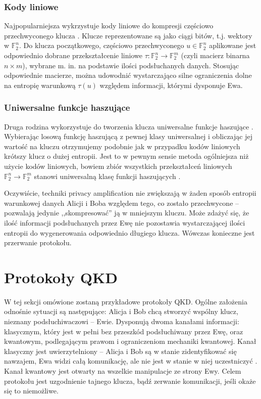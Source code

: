 \documentclass[10pt]{article}
\begin{document}
\subsubsection*{Kody liniowe}
Najpopularniejsza wykrzystuje kody liniowe do kompresji częściowo przechwyconego klucza \cite{Mayers01}.
Klucze reprezentowane są jako ciągi bitów, t.j. wektory w \(\mathbb{F}_2^n\). Do klucza początkowego,
częściowo przechwyconego \(u\in\mathbb{F}_2^n\) aplikowane jest odpowiednio dobrane przekształcenie 
liniowe \(\tau\colon\mathbb{F}_2^n\rightarrow \mathbb{F}_2^m\) (czyli macierz binarna \(n\times m\)), 
wybrane m. in. na podstawie ilości podsłuchanych danych. Stosując odpowiednie macierze, można udowodnić
wystarczająco silne ograniczenia dolne na entropię warunkową \(\tau(u)\) względem informacji,
którymi dysponuje Ewa.

\subsubsection*{Uniwersalne funkcje haszujące}

Druga rodzina wykorzystuje do tworzenia klucza uniwersalne funkcje haszujące \cite{Bennett95,Watanabe07}.
Wybierając losową funkcję haszującą z pewnej klasy uniwersalnej i obliczając jej wartość na kluczu
otrzymujemy podobnie jak w przypadku kodów liniowych krótszy klucz o dużej entropii. Jest to w pewnym
sensie metoda ogólniejsza niż użycie kodów liniowych, bowiem zbiór wszystkich przekształceń liniowych
\(\mathbb{F}_2^n\rightarrow \mathbb{F}_2^m\) stanowi uniwersalną klasę funkcji haszujących 
\cite{Carter79}.

\vspace{3mm}

Oczywiście, techniki privacy amplification nie zwiększają w żaden sposób entropii warunkowej danych
Alicji i Boba względem tego, co zostało przechwycone -- pozwalają jedynie ,,skompresować'' ją w
mniejszym kluczu. Może zdażyć się, że ilość informacji podsłuchanych przez Ewę nie pozostawia 
wystarczającej ilości entropii do wygenerowania odpowiednio długiego klucza. Wówczas konieczne jest
przerwanie protokołu. 


\section{Protokoły QKD}

W tej sekcji omówione zostaną przykładowe protokoły QKD. Ogólne założenia odnośnie sytuacji są
następujące: Alicja i Bob chcą stworzyć wspólny klucz, nieznany podsłuchiwaczowi -- Ewie. Dysponują
dwoma kanałami informacji: klasycznym, który jest w pełni bez przeszkód podsłuchiwany przez Ewę,
oraz kwantowym, podlegającym prawom i ograniczeniom mechaniki kwantowej. Kanał klasyczny jest
uwierzytelniony -- Alicja i Bob są w stanie zidentyfikować się nawzajem, Ewa widzi całą komunikację,
ale nie jest w stanie w niej uczestniczyć \footnotemark. Kanał kwantowy jest otwarty na wszelkie 
manipulacje ze strony Ewy. Celem protokołu jest uzgodnienie tajnego klucza, bądź zerwanie komunikacji,
jeśli okaże się to niemożliwe.
\end{document}
